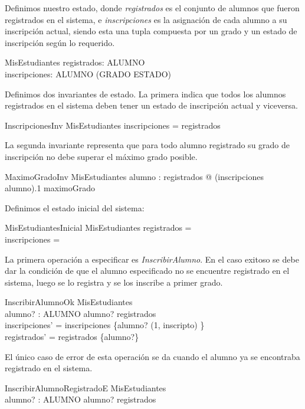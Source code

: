 \documentclass{article}
\begin{document}
Definimos nuestro estado, donde \emph{registrados} es el conjunto de alumnos que fueron registrados en el sistema, e \emph{inscripciones} es la asignación de cada alumno a su inscripción actual, siendo esta una tupla compuesta por un grado y un estado de inscripción según lo requerido.
\begin{schema}{MisEstudiantes}
  registrados: \power ALUMNO \\
  inscripciones: ALUMNO \pfun (GRADO \cross ESTADO)
\end{schema}

Definimos dos invariantes de estado. La primera indica que todos los alumnos registrados en el sistema deben tener un estado de inscripción actual y viceversa.
\begin{schema}{InscripcionesInv}
  MisEstudiantes
  \where
  \dom inscripciones = registrados
\end{schema}

La segunda invariante representa que para todo alumno registrado su grado de inscripción no debe superar el máximo grado posible.
\begin{schema}{MaximoGradoInv}
    MisEstudiantes
    \where
    \forall alumno : registrados @ (inscripciones \; alumno).1 \leq maximoGrado
\end{schema}

Definimos el estado inicial del sistema:
\begin{schema}{MisEstudiantesInicial}
    MisEstudiantes
    \where
    registrados = \emptyset \\
    inscripciones = \emptyset
\end{schema}

La primera operación a especificar es \emph{InscribirAlumno}. En el caso exitoso se debe dar la condición de que el alumno especificado no se encuentre registrado en el sistema, luego se lo registra y se los inscribe a primer grado.
\begin{schema}{InscribirAlumnoOk}
    \Delta MisEstudiantes \\
    alumno? : ALUMNO
    \where
    alumno? \notin registrados \\
    inscripciones' = inscripciones \cup \{alumno? \mapsto (1, inscripto) \} \\
    registrados' = registrados \cup \{alumno?\}
\end{schema}

El único caso de error de esta operación se da cuando el alumno ya se encontraba registrado en el sistema.
\begin{schema}{InscribirAlumnoRegistradoE}
    \Xi MisEstudiantes \\
    alumno? : ALUMNO
    \where
    alumno? \in registrados
\end{schema}
\end{document}
